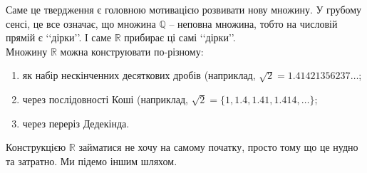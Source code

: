\documentclass[a4paper, 14pt]{article}
\theoremstyle{theoremdd}
\theoremstyle{theoremdd}
\theoremstyle{theoremdd}
\theoremstyle{theoremdd}
\theoremstyle{theoremdd}
\theoremstyle{theoremdd}
\theoremstyle{theoremdd}
\theoremstyle{theoremdd}
\begin{document}
	Саме це твердження є головною мотивацією розвивати нову множину. У грубому сенсі, це все означає, що множина $\mathbb{Q}$ -- неповна множина, тобто на числовій прямій є \lq\lq дірки\rq\rq. І саме $\mathbb{R}$ прибирає ці самі  \lq\lq дірки\rq\rq . \\
	Множину $\mathbb{R}$ можна конструювати по-різному:
	\begin{enumerate}[nosep,wide=0pt,label={\arabic*)}]
	\item як набір нескінченних десяткових дробів (наприклад, $\sqrt{2} = 1.41421356237\dots$;
	\item через послідовності Коші (наприклад, $\sqrt{2} = \{1, 1.4, 1.41, 1.414, \dots\}$;
	\item через переріз Дедекінда.
	\end{enumerate}
	Конструкцією $\mathbb{R}$ займатися не хочу на самому початку, просто тому що це нудно та затратно. Ми підемо іншим шляхом.
	
\end{document}
